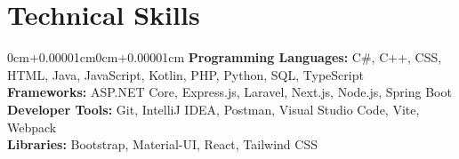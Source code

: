 \documentclass[10pt, letterpaper]{article}
\newenvironment{onecolentry}{\begin{adjustwidth}{0cm+0.00001cm}{0cm+0.00001cm}}{\end{adjustwidth}}
\begin{document}
\section{Technical Skills}
\begin{onecolentry}
    \textbf{Programming Languages:} C\#, C++, CSS, HTML, Java, JavaScript, Kotlin, PHP, Python, SQL, TypeScript \\
    \vspace{0.10cm}
    \textbf{Frameworks:} ASP.NET Core, Express.js, Laravel, Next.js, Node.js, Spring Boot \\
    \vspace{0.10cm}
    \textbf{Developer Tools:} Git, IntelliJ IDEA, Postman, Visual Studio Code, Vite, Webpack \\
    \vspace{0.10cm}
    \textbf{Libraries:} Bootstrap, Material-UI, React, Tailwind CSS \\
    \vspace{0.10cm}

\end{onecolentry}
\end{document}
